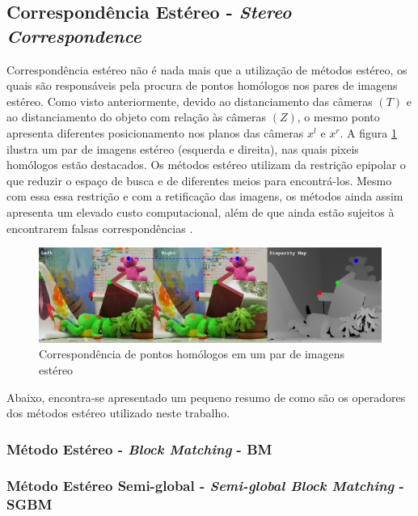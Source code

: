 \subsection{Correspondência Estéreo - \textit{Stereo Correspondence}}
Correspondência estéreo não é nada mais que a utilização de métodos estéreo, os quais são responsáveis pela procura de pontos homólogos nos pares de imagens estéreo. Como visto anteriormente, devido ao distanciamento das câmeras $(T)$ e ao distanciamento do objeto com relação às câmeras $(Z)$, o mesmo ponto apresenta diferentes posicionamento nos planos das câmeras $x^l$ e $x^r$. A figura \ref{homologous_points _stereo} ilustra um par de imagens estéreo (esquerda e direita), nas quais pixeis homólogos estão destacados. Os métodos estéreo utilizam da restrição epipolar o que reduzir o espaço de busca e de diferentes meios para encontrá-los. Mesmo com essa essa restrição e com a retificação das imagens, os métodos ainda assim apresenta um elevado custo computacional, além de que ainda estão sujeitos à encontrarem falsas correspondências \cite{Bradski2008}. 

\begin{figure}[H]
 	\centering
 	\includegraphics[scale=0.35]{./Resources/homologous_points_stereo.png}
 	\caption{Correspondência de pontos homólogos em um par de imagens estéreo}
 	\label{homologous_points _stereo}
\end{figure}

Abaixo, encontra-se apresentado um pequeno resumo de como são os operadores dos métodos estéreo utilizado neste trabalho.

\subsubsection{Método Estéreo - \textit{Block Matching} - BM}

\subsubsection{Método Estéreo Semi-global - \textit{Semi-global Block Matching} - SGBM}

